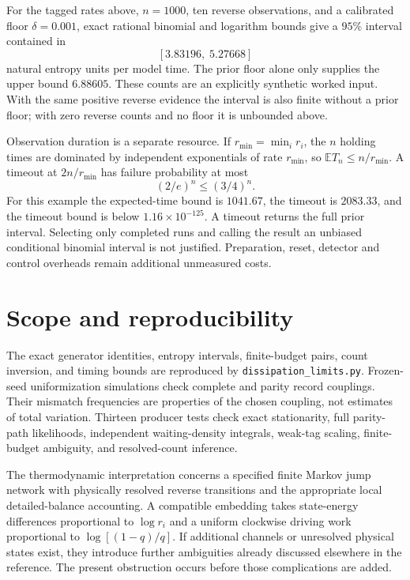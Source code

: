 For the tagged rates above, $n=1000$, ten reverse observations, and a calibrated
floor $\delta=0.001$, exact rational binomial and logarithm bounds give a $95\%$
interval contained in
\[
 [3.83196,\;5.27668]
\]
natural entropy units per model time. The prior floor alone only supplies the
upper bound $6.88605$. These counts are an explicitly synthetic worked input.
With the same positive reverse evidence the interval is also finite without a
prior floor; with zero reverse counts and no floor it is unbounded above.

Observation duration is a separate resource. If $r_{\min}=\min_i r_i$, the
$n$ holding times are dominated by independent exponentials of rate
$r_{\min}$, so $\mathbb E T_n\le n/r_{\min}$. A timeout at
$2n/r_{\min}$ has failure probability at most
\[
 (2/e)^n\le(3/4)^n.
\]
For this example the expected-time bound is $1041.67$, the timeout is
$2083.33$, and the timeout bound is below $1.16\times10^{-125}$. A timeout
returns the full prior interval. Selecting only completed runs and calling the
result an unbiased conditional binomial interval is not justified. Preparation,
reset, detector and control overheads remain additional unmeasured costs.

\section{Scope and reproducibility}
The exact generator identities, entropy intervals, finite-budget pairs,
count inversion, and timing bounds are reproduced by
\texttt{dissipation\_limits.py}. Frozen-seed uniformization simulations check
complete and parity record couplings. Their mismatch frequencies are properties
of the chosen coupling, not estimates of total variation. Thirteen producer
tests check exact stationarity, full parity-path likelihoods, independent
waiting-density integrals, weak-tag scaling, finite-budget ambiguity, and
resolved-count inference.

The thermodynamic interpretation concerns a specified finite Markov jump
network with physically resolved reverse transitions and the appropriate local
detailed-balance accounting. A compatible embedding takes state-energy
differences proportional to $\log r_i$ and a uniform clockwise driving work
proportional to $\log[(1-q)/q]$. If additional channels or unresolved physical
states exist, they introduce further ambiguities already discussed elsewhere
in the reference. The present obstruction occurs before those complications
are added.
